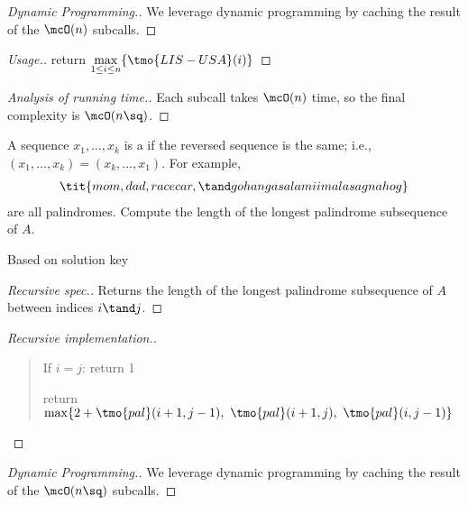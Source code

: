 \documentclass{article}
\begin{document}
\begin{proof}[Dynamic Programming.]
  We leverage dynamic programming by caching the result of the $ \mcO(n) $ subcalls.
\end{proof}

\begin{proof}[Usage.]
  return $ \max\limits_{1\leq i\leq n}\{\tmo{LIS-USA}(i)\} $
\end{proof}

\begin{proof}[Analysis of running time.]
  Each subcall takes $ \mcO(n) $ time, so the final complexity is $ \mcO(n\sq) $.
\end{proof}
\pagebreak

\begin{subexercise}
A sequence $ x_1,\ldots, x_k $ is a  if the reversed sequence is the same; i.e., $ (x_1,\ldots,x_k) = (x_k,\ldots,x_1) $. For example, \begin{align*}
  \tit{mom, dad, racecar,\tand gohangasalamiimalasagnahog}
\end{align*}
are all palindromes. Compute the length of the longest palindrome subsequence of $ A $.
\end{subexercise}

\begin{note}
  Based on solution key
\end{note}

\begin{proof}[Recursive spec.]
  Returns the length of the longest palindrome subsequence of $ A $ between indices $ i \tand j $.
\end{proof}

\begin{proof}[Recursive implementation.]\
\begin{quote}
\begin{steps}
  \item If $ i = j $: return 1
  \item return $ \max\{ 2+\tmo{pal}(i+1,j-1),\ \tmo{pal}(i+1,j),\ \tmo{pal}(i,j-1) \} $
\end{steps}
\end{quote}
\end{proof}

\begin{proof}[Dynamic Programming.]
  We leverage dynamic programming by caching the result of the $ \mcO(n\sq) $ subcalls.
\end{proof}
\end{document}
